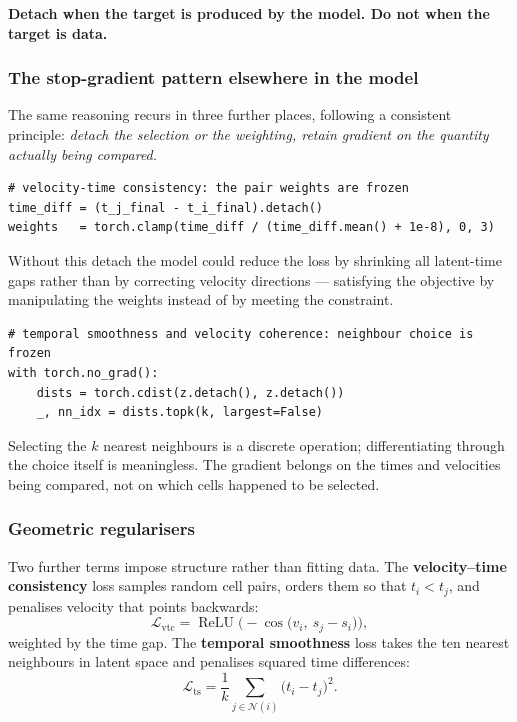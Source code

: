 \documentclass[11pt,a4paper]{article}
\newenvironment{keybox}{\begin{shaded}\noindent}{\end{shaded}}
\newcommand{\spl}{s}
\theoremstyle{definition}
\begin{document}
\begin{keybox}
\textbf{Detach when the target is produced by the model. Do not when the target
is data.}
\end{keybox}

\subsubsection{The stop-gradient pattern elsewhere in the model}

The same reasoning recurs in three further places, following a consistent
principle: \emph{detach the selection or the weighting, retain gradient on the
quantity actually being compared.}

\begin{lstlisting}
# velocity-time consistency: the pair weights are frozen
time_diff = (t_j_final - t_i_final).detach()
weights   = torch.clamp(time_diff / (time_diff.mean() + 1e-8), 0, 3)
\end{lstlisting}

Without this detach the model could reduce the loss by shrinking all latent-time
gaps rather than by correcting velocity directions --- satisfying the objective
by manipulating the weights instead of by meeting the constraint.

\begin{lstlisting}
# temporal smoothness and velocity coherence: neighbour choice is frozen
with torch.no_grad():
    dists = torch.cdist(z.detach(), z.detach())
    _, nn_idx = dists.topk(k, largest=False)
\end{lstlisting}

Selecting the $k$ nearest neighbours is a discrete operation; differentiating
through the choice itself is meaningless. The gradient belongs on the times and
velocities being compared, not on which cells happened to be selected.

\subsubsection{Geometric regularisers}

Two further terms impose structure rather than fitting data. The
\textbf{velocity--time consistency} loss samples random cell pairs, orders them
so that $t_i < t_j$, and penalises velocity that points backwards:
%
\begin{equation}
\mathcal{L}_{\text{vtc}} = \operatorname{ReLU}\!\Big(-\cos\big(v_i,\ \spl_j - \spl_i\big)\Big),
\end{equation}
%
weighted by the time gap. The \textbf{temporal smoothness} loss takes the ten
nearest neighbours in latent space and penalises squared time differences:
%
\begin{equation}
\mathcal{L}_{\text{ts}} = \frac{1}{k}\sum_{j \in \mathcal{N}(i)} \big(t_i - t_j\big)^2 .
\end{equation}
\end{document}
